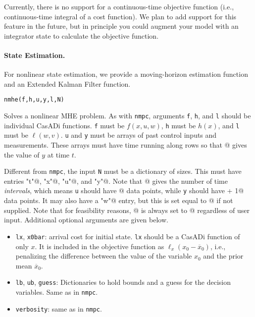 \documentclass{article}
\newcommand{\funcname}[2][.25em]{\vspace{#1}\noindent\texttt{#2}\nopagebreak\vspace{#1}}
\newcommand{\casadi}{CasADi}
\begin{document}
\begin{multicols}{2}
Currently, there is no support for a continuous-time objective function (i.e., continuous-time integral of a cost function).
We plan to add support for this feature in the future, but in principle you could augment your model with an integrator state to calculate the objective function.

\paragraph*{State Estimation.}

For nonlinear state estimation, we provide a moving-horizon estimation function and an Extended Kalman Filter function.

\funcname{nmhe(f,h,u,y,l,N)}

Solves a nonlinear MHE problem.
As with \texttt{nmpc}, arguments \texttt{f}, \texttt{h}, and \texttt{l} should be individual \casadi{} functions.
\texttt{f} must be $f(x,u,w)$, \texttt{h} must be $h(x)$, and \texttt{l} must be $\ell(w,v)$.
\texttt{u} and \texttt{y} must be arrays of past control inputs and measurements.
These arrays must have time running along rows so that \lstinline@y[t,:]@ gives the value of $y$ at time $t$.

Different from \texttt{nmpc}, the input \texttt{N} must be a dictionary of sizes.
This must have entries \lstinline@"t"@, \lstinline@"x"@, \lstinline@"u"@, and \lstinline@"y"@.
Note that \lstinline@N["t"]@ gives the number of time \emph{intervals}, which means \texttt{u} should have \lstinline@N["t"]@ data points, while \texttt{y} should have \lstinline@N["t"] + 1@ data points.
It may also have a \lstinline@"w"@ entry, but this is set equal to \lstinline@N["x"]@ if not supplied.
Note that for feasibility reasons, \lstinline@N["v"]@ is always set to \lstinline@N["y"]@ regardless of user input. Additional optional arguments are given below.

\begin{itemize}[noitemsep,nolistsep]
    \item \texttt{lx}, \texttt{x0bar}: arrival cost for initial state.
    \texttt{lx} should be a \casadi{} function of only $x$.
    It is included in the objective function as $\ell_x(x_0 - \overline{x}_0)$, i.e., penalizing the difference between the value of the variable $x_0$ and the prior mean $\overline{x}_0$.
    \item \texttt{lb}, \texttt{ub}, \texttt{guess}: Dictionaries to hold bounds and a guess for the decision variables.
    Same as in \texttt{nmpc}.
    \item \texttt{verbosity}: same as in \texttt{nmpc}.
\end{itemize}


\end{multicols}
\end{document}
